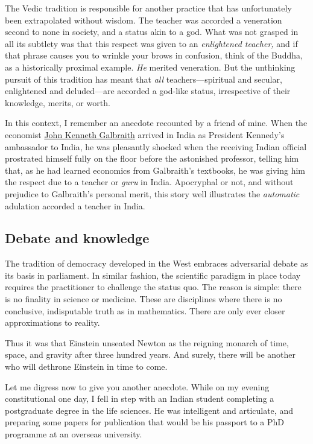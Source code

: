 \documentclass[
  12pt,
  british,
  a4paper,
  rgb,
  dvipsnames,
  svgnames,
  hyphens]{article}
\begin{document}
The Vedic tradition is responsible for another practice that has
unfortunately been extrapolated without wisdom. The teacher was accorded
a veneration second to none in society, and a status akin to a god. What
was not grasped in all its subtlety was that this respect was given to
an \emph{enlightened teacher,} and if that phrase causes you to wrinkle
your brows in confusion, think of the Buddha, as a historically proximal
example. \emph{He} merited veneration. But the unthinking pursuit of
this tradition has meant that \emph{all} teachers---spiritual and
secular, enlightened and deluded---are accorded a god-like status,
irrespective of their knowledge, merits, or worth.

In this context, I remember an anecdote recounted by a friend of mine.
When the economist
\href{http://en.wikipedia.org/wiki/John_Kenneth_Galbraith}{John Kenneth
Galbraith} arrived in India as President Kennedy's ambassador to India,
he was pleasantly shocked when the receiving Indian official prostrated
himself fully on the floor before the astonished professor, telling him
that, as he had learned economics from Galbraith's textbooks, he was
giving him the respect due to a teacher or \emph{guru} in India.
Apocryphal or not, and without prejudice to Galbraith's personal merit,
this story well illustrates the \emph{automatic} adulation accorded a
teacher in India.

\hypertarget{debate-and-knowledge}{%
\subsection{Debate and knowledge}\label{debate-and-knowledge}}

The tradition of democracy developed in the West embraces adversarial
debate as its basis in parliament. In similar fashion, the scientific
paradigm in place today requires the practitioner to challenge the
status quo. The reason is simple: there is no finality in science or
medicine. These are disciplines where there is no conclusive,
indisputable truth as in mathematics. There are only ever closer
approximations to reality.

Thus it was that Einstein unseated Newton as the reigning monarch of
time, space, and gravity after three hundred years. And surely, there
will be another who will dethrone Einstein in time to come.

Let me digress now to give you another anecdote. While on my evening
constitutional one day, I fell in step with an Indian student completing
a postgraduate degree in the life sciences. He was intelligent and
articulate, and preparing some papers for publication that would be his
passport to a PhD programme at an overseas university.
\end{document}

